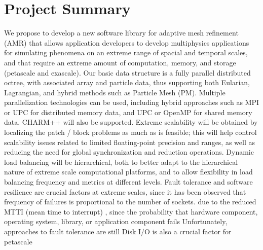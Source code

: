 \documentclass{article}
\begin{document}
\nocite{StSh09} %
\nocite{WiHy03} %
\nocite{GuWi06} %
\nocite{BuGh08} %



\section{Project Summary} \label{s:summary}

%
%
We propose to develop a new software library for adaptive mesh
refinement (AMR) that allows application developers to develop
multiphysics applications for simulating phenomena on an extreme range
of spacial and temporal scales, and that require an extreme amount of
computation, memory, and storage (petascale and exascale).
%
Our basic data structure is a fully parallel distributed octree, with
associated array and particle data, thus supporting both Eularian, Lagrangian,
and hybrid methods such as Particle Mesh (PM).
%
Multiple parallelization technologies can be used, including hybrid
approaches such as MPI or UPC for distributed memory data, and UPC or
OpenMP for shared memory data.  CHARM++ will also be supported.
Extreme scalability will be obtained by localizing the patch / block
problems as much as is feasible; this will help control scalability
issues related to limited floating-point precision and ranges, as well
as reducing the need for global synchronization and reduction
operations.
%
Dynamic load balancing will be hierarchical, both to better adapt to
the hierarchical nature of extreme scale computational platforms, and
to allow flexibility in load balancing frequency and metrics at different
levels.
%
Fault tolerance and software resilience are crucial factors at extreme scales,
since it has been observed that frequency of failures is proportional to
the number of sockets.
due to the reduced MTTI (mean time to interrupt) , since the probability that hardware component, operating system, library, or application component fails Unfortunately, approaches to fault tolerance are still 
%
Disk I/O is also a crucial factor for petascale 
\end{document}
